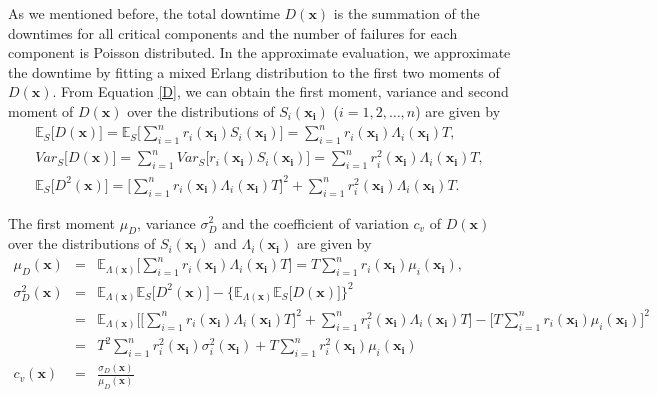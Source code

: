 \documentclass[preprint,12pt]{elsarticle}
\begin{document}
As we mentioned before, the total downtime $D(\boldsymbol{x})$ is the summation of the downtimes for all critical components and the number of failures for each component is Poisson distributed. In the approximate evaluation, we approximate the downtime by fitting a mixed Erlang distribution to the first two moments of $D(\boldsymbol{x})$. From Equation \eqref{D}, we can obtain the first moment, variance and second moment of $D(\boldsymbol{x})$ over the distributions of $S_{i}(\boldsymbol{x_{i}})$ ($i=1,2,\dots,n$) are given by
\begin{eqnarray}
\mathbb{E}_{S}\bigg[D(\boldsymbol{x})\bigg]=\mathbb{E}_{S}\bigg[\sum_{i=1}^{n}{r_{i}(\boldsymbol{x_{i}})S_{i}(\boldsymbol{x_{i}})}\bigg]=\sum_{i=1}^{n}{r_{i}(\boldsymbol{x_{i}})\Lambda_{i}(\boldsymbol{x_{i}})T},
\label{ED1}\\
Var_{S}\bigg[D(\boldsymbol{x})\bigg]=\sum_{i=1}^{n}{Var_{S}\bigg[{r_{i}(\boldsymbol{x_{i}})S_{i}(\boldsymbol{x_{i}})}\bigg]}=\sum_{i=1}^{n}{r_{i}^{2}(\boldsymbol{x_{i}})\Lambda_{i}(\boldsymbol{x_{i}})T},
\label{VD1}\\
\mathbb{E}_{S}\bigg[D^{2}(\boldsymbol{x}) \bigg]= \bigg[\sum_{i=1}^{n}{r_{i}(\boldsymbol{x_{i}})\Lambda_{i}(\boldsymbol{x_{i}})T}\bigg]^{2} + \sum_{i=1}^{n}{r_{i}^{2}(\boldsymbol{x_{i}})\Lambda_{i}(\boldsymbol{x_{i}})T}.
\end{eqnarray}

The first moment $\mu_{D}$, variance $\sigma^{2}_{D}$ and the coefficient of variation $c_{v}$  of $D(\boldsymbol{x})$ over the distributions of $S_{i}(\boldsymbol{x_{i}})$ and $\Lambda_{i}(\boldsymbol{x_{i}})$ are given by
\begin{eqnarray}
\mu_{D}(\boldsymbol{x})&=&\mathbb{E}_{\Lambda(\boldsymbol{x})}\bigg[\sum_{i=1}^{n}{r_{i}(\boldsymbol{x_{i}})\Lambda_{i}(\boldsymbol{x_{i}})T}\bigg]=T\sum_{i=1}^{n}{r_{i}(\boldsymbol{x_i})\mu_{i}(\boldsymbol{x_i})},
\label{muD}\\
\sigma^{2}_{D}(\boldsymbol{x})&=&\mathbb{E}_{\Lambda(\boldsymbol{x})}\mathbb{E}_{S} \bigg[D^{2}(\boldsymbol{x}) \bigg]- \bigg\{\mathbb{E}_{\Lambda(\boldsymbol{x})}\mathbb{E}_{S}\bigg[D(\boldsymbol{x}) \bigg] \bigg\}^{2} \nonumber\\
&=& \mathbb{E}_{\Lambda(\boldsymbol{x})}\bigg[\bigg[\sum_{i=1}^{n}{r_{i}(\boldsymbol{x_{i}})\Lambda_{i}(\boldsymbol{x_{i}})T}\bigg]^{2} +\sum_{i=1}^{n}{r_{i}^{2}(\boldsymbol{x_{i}})\Lambda_{i}(\boldsymbol{x_{i}})T}\bigg]-\bigg[T\sum_{i=1}^{n}{r_{i}(\boldsymbol{x_i})\mu_{i}(\boldsymbol{x_i})}\bigg]^{2}\nonumber\\
&=&T^{2}\sum_{i=1}^{n}{r_{i}^{2}(\boldsymbol{x_i})\sigma_{i}^{2}(\boldsymbol{x_i})}+T\sum_{i=1}^{n}{r_{i}^{2}(\boldsymbol{x_i})\mu_{i}(\boldsymbol{x_i})}
\label{sigma}\\
c_{v}(\boldsymbol{x}) &=& \frac{\sigma_{D}(\boldsymbol{x})}{\mu_{D}(\boldsymbol{x})}\\
\end{eqnarray}
\end{document}
